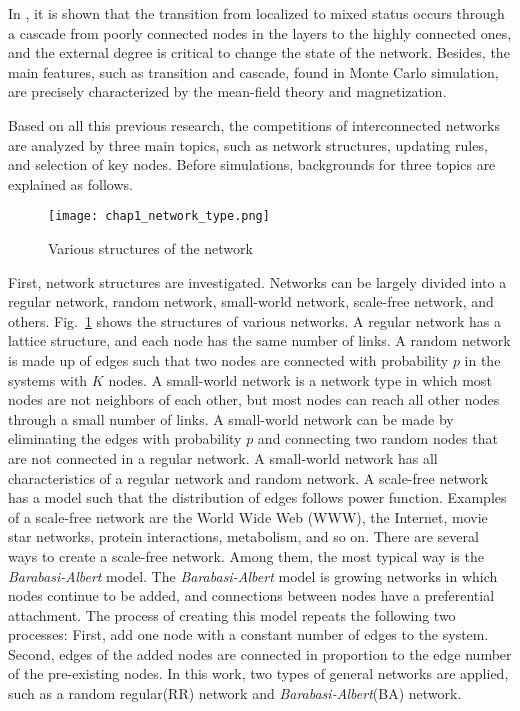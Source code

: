 In \parencite{gomez2015}, it is shown that the transition from localized to mixed status occurs through a cascade from poorly connected nodes in the layers to the highly connected ones, and the external degree is critical to change the state of the network. Besides, the main features, such as transition and cascade, found in Monte Carlo simulation, are precisely characterized by the mean-field theory and magnetization\parencite{alvarez2016, diep2017, amato2017, gomez2015}. 

Based on all this previous research, the competitions of interconnected networks are analyzed by three main topics, such as network structures, updating rules, and selection of key nodes. Before simulations, backgrounds for three topics are explained as follows. 

\begin{figure}[!htb]
	\centering
	\texttt{[image: chap1\_network\_type.png]}
	\caption{Various structures of the network}
	\label{chap1_network_type}
\end{figure}

First, network structures are investigated. Networks can be largely divided into a regular network, random network\parencite{erdos1960}, small-world network\parencite{watts1998}, scale-free network\parencite{barabasi1999}, and others. Fig.~\ref{chap1_network_type} shows the structures of various networks. A regular network has a lattice structure, and each node has the same number of links. A random network is made up of edges such that two nodes are connected with probability $p$ in the systems with $K$ nodes. A small-world network is a network type in which most nodes are not neighbors of each other, but most nodes can reach all other nodes through a small number of links. A small-world network can be made by eliminating the edges with probability $p$ and connecting two random nodes that are not connected in a regular network. A small-world network has all characteristics of a regular network and random network. A scale-free network has a model such that the distribution of edges follows power function. Examples of a scale-free network are the World Wide Web (WWW), the Internet, movie star networks, protein interactions, metabolism, and so on. There are several ways to create a scale-free network. Among them, the most typical way is the \textit{Barabasi-Albert} model. The \textit{Barabasi-Albert} model is growing networks in which nodes continue to be added, and connections between nodes have a preferential attachment. The process of creating this model repeats the following two processes: First, add one node with a constant number of edges to the system. Second, edges of the added nodes are connected in proportion to the edge number of the pre-existing nodes. In this work, two types of general networks are applied, such as a random regular(RR) network and \textit{Barabasi-Albert}(BA) network. 

